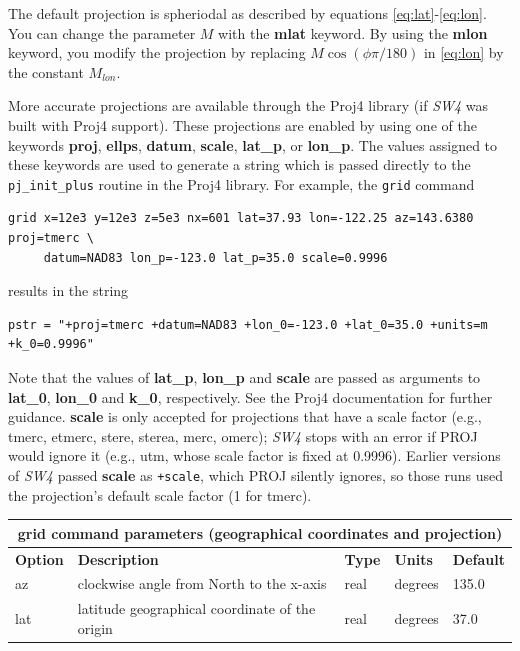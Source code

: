 \documentclass[11pt]{report}
\begin{document}
{The default projection is spheriodal as described by equations \eqref{eq:lat}-\eqref{eq:lon}. You
can change the parameter $M$ with the {\bf mlat} keyword. By using the {\bf mlon} keyword, you
modify the projection by replacing $M\cos(\phi\pi/180)$ in \eqref{eq:lon} by the constant
$M_{lon}$.

More accurate projections are available through the Proj4 library (if \emph{SW4} was built with
Proj4 support). These projections are enabled by using one of the keywords {\bf proj}, {\bf ellps},
{\bf datum}, {\bf scale}, {\bf lat\_p}, or {\bf lon\_p}. The values assigned to these keywords are
used to generate a string which is passed directly to the {\tt pj\_init\_plus} routine in the Proj4
library. For example, the \verb+grid+ command
\begin{verbatim}
grid x=12e3 y=12e3 z=5e3 nx=601 lat=37.93 lon=-122.25 az=143.6380 proj=tmerc \
     datum=NAD83 lon_p=-123.0 lat_p=35.0 scale=0.9996
\end{verbatim}
results in the string
\begin{verbatim}
pstr = "+proj=tmerc +datum=NAD83 +lon_0=-123.0 +lat_0=35.0 +units=m +k_0=0.9996"
\end{verbatim}
Note that the values of {\bf lat\_p}, {\bf lon\_p} and {\bf scale} are passed as arguments to {\bf lat\_0},
	{\bf lon\_0} and {\bf k\_0}, respectively. See the Proj4 documentation for further guidance.
{\bf scale} is only accepted for projections that have a scale factor (e.g., tmerc, etmerc, stere,
sterea, merc, omerc); \emph{SW4} stops with an error if PROJ would ignore it (e.g., utm, whose scale
factor is fixed at 0.9996). Earlier versions of \emph{SW4} passed {\bf scale} as {\tt +scale}, which
PROJ silently ignores, so those runs used the projection's default scale factor (1 for tmerc).
\begin{center}
	\begin{tabular}{|l|p{8cm}|l|l|l|} \hline
		\multicolumn{5}{|c|}{\bf grid command parameters (geographical coordinates and projection)}                  \\ \hline
		\bf{Option} & \bf{Description}                                       & \bf{Type} & \bf{Units} & \bf{Default} \\ \hline \hline
		az          & clockwise angle from North to the x-axis               & real      & degrees    & 135.0        \\ \hline
		lat         & latitude geographical coordinate of the origin         & real      & degrees    & 37.0         \\ \hline

\end{tabular}
\end{center}}
\end{document}
